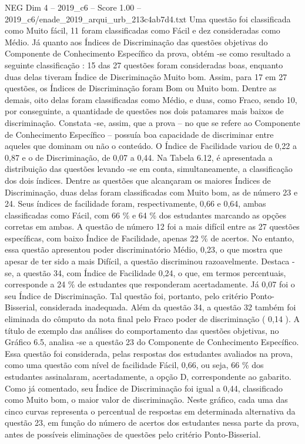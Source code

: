 \begin{textsample}{NEG Dim 4 – 2019\_c6 – Score 1.00 – 2019\_c6/enade\_2019\_arqui\_urb\_213c4ab7d4.txt}
Uma questão foi classificada como Muito fácil, 11 foram classificadas como Fácil e dez consideradas como Médio.
Já quanto aos Índices de Discriminação das questões objetivas do Componente de Conhecimento Específico da prova, obtém -se como resultado a seguinte classificação : 15 das 27 questões foram consideradas boas, enquanto duas delas tiveram Índice de Discriminação Muito bom.
Assim, para 17 em 27 questões, os Índices de Discriminação foram Bom ou Muito bom.
Dentre as demais, oito delas foram classificadas como Médio, e duas, como Fraco, sendo 10, por conseguinte, a quantidade de questões nos dois patamares mais baixos de discriminação.
Constata -se, assim, que a prova – no que se refere ao Componente de Conhecimento Específico – possuía boa capacidade de discriminar entre aqueles que dominam ou não o conteúdo.
O Índice de Facilidade variou de 0,22 a 0,87 e o de Discriminação, de 0,07 a 0,44.
Na Tabela 6.12, é apresentada a distribuição das questões levando -se em conta, simultaneamente, a classificação dos dois índices.
Dentre as questões que alcançaram os maiores Índices de Discriminação, duas delas foram classificadas com Muito bom, as de número 23 e 24.
Seus índices de facilidade foram, respectivamente, 0,66 e 0,64, ambas classificadas como Fácil, com 66 \% e 64 \% dos estudantes marcando as opções corretas em ambas.
A questão de número 12 foi a mais difícil entre as 27 questões específicas, com baixo Índice de Facilidade, apenas 22 \% de acertos.
No entanto, essa questão apresentou poder discriminatório Médio, 0,23, o que mostra que apesar de ter sido a mais Difícil, a questão discriminou razoavelmente.
Destaca -se, a questão 34, com Índice de Facilidade 0,24, o que, em termos percentuais, corresponde a 24 \% de estudantes que responderam acertadamente.
Já 0,07 foi o seu Índice de Discriminação.
Tal questão foi, portanto, pelo critério Ponto-Bisserial, considerada inadequada.
Além da questão 34, a questão 32 também foi eliminada do cômputo da nota final pelo Fraco poder de discriminação ( 0,14 ).
A título de exemplo das análises do comportamento das questões objetivas, no Gráfico 6.5, analisa -se a questão 23 do Componente de Conhecimento Específico.
Essa questão foi considerada, pelas respostas dos estudantes avaliados na prova, como uma questão com nível de facilidade Fácil, 0,66, ou seja, 66 \% dos estudantes assinalaram, acertadamente, a opção D, correspondente ao gabarito.
Como já comentado, seu Índice de Discriminação foi igual a 0,44, classificado como Muito bom, o maior valor de discriminação.
Neste gráfico, cada uma das cinco curvas representa o percentual de respostas em determinada alternativa da questão 23, em função do número de acertos dos estudantes nessa parte da prova, antes de possíveis eliminações de questões pelo critério Ponto-Bisserial.

\end{textsample}
